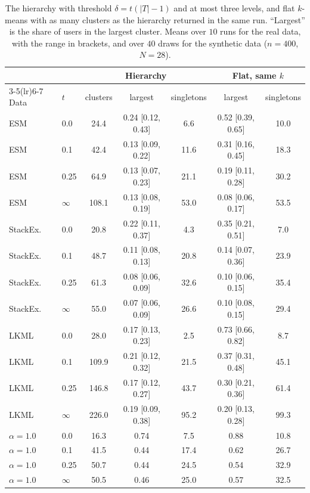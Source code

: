 \documentclass[11pt]{article}
\theoremstyle{remark}\newtheorem{remark}{Remark}\renewcommand{\theremark}{S\arabic{remark}}
\begin{document}
\begin{table}[ht]
\centering
\caption{The hierarchy with threshold $\delta=t(|T|-1)$ and at most three levels, and flat $k$-means with as many clusters as the hierarchy returned in the same run. ``Largest'' is the share of users in the largest cluster. Means over $10$ runs for the real data, with the range in brackets, and over $40$ draws for the synthetic data ($n=400$, $N=28$).}\label{tab:equalk}
\setlength{\tabcolsep}{4pt}\small
\begin{tabular}{llccccc}
\toprule
& & \multicolumn{3}{c}{Hierarchy} & \multicolumn{2}{c}{Flat, same $k$} \\
\cmidrule(lr){3-5}\cmidrule(lr){6-7}
Data & $t$ & clusters & largest & singletons & largest & singletons \\
\midrule
ESM & 0.0 & 24.4 & 0.24 [0.12, 0.43] & 6.6 & 0.52 [0.39, 0.65] & 10.0 \\
ESM & 0.1 & 42.4 & 0.13 [0.09, 0.22] & 11.6 & 0.31 [0.16, 0.45] & 18.3 \\
ESM & 0.25 & 64.9 & 0.13 [0.07, 0.23] & 21.1 & 0.19 [0.11, 0.28] & 30.2 \\
ESM & $\infty$ & 108.1 & 0.13 [0.08, 0.19] & 53.0 & 0.08 [0.06, 0.17] & 53.5 \\
StackEx. & 0.0 & 20.8 & 0.22 [0.11, 0.37] & 4.3 & 0.35 [0.21, 0.51] & 7.0 \\
StackEx. & 0.1 & 48.7 & 0.11 [0.08, 0.13] & 20.8 & 0.14 [0.07, 0.36] & 23.9 \\
StackEx. & 0.25 & 61.3 & 0.08 [0.06, 0.09] & 32.6 & 0.10 [0.06, 0.15] & 35.4 \\
StackEx. & $\infty$ & 55.0 & 0.07 [0.06, 0.09] & 26.6 & 0.10 [0.08, 0.15] & 29.4 \\
LKML & 0.0 & 28.0 & 0.17 [0.13, 0.23] & 2.5 & 0.73 [0.66, 0.82] & 8.7 \\
LKML & 0.1 & 109.9 & 0.21 [0.12, 0.32] & 21.5 & 0.37 [0.31, 0.48] & 45.1 \\
LKML & 0.25 & 146.8 & 0.17 [0.12, 0.27] & 43.7 & 0.30 [0.21, 0.36] & 61.4 \\
LKML & $\infty$ & 226.0 & 0.19 [0.09, 0.38] & 95.2 & 0.20 [0.13, 0.28] & 99.3 \\
\midrule
$\alpha=1.0$ & 0.0 & 16.3 & 0.74 & 7.5 & 0.88 & 10.8 \\
$\alpha=1.0$ & 0.1 & 41.5 & 0.44 & 17.4 & 0.62 & 26.7 \\
$\alpha=1.0$ & 0.25 & 50.7 & 0.44 & 24.5 & 0.54 & 32.9 \\
$\alpha=1.0$ & $\infty$ & 50.5 & 0.46 & 25.0 & 0.57 & 32.5 \\

\end{tabular}
\end{table}
\end{document}
